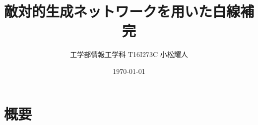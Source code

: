 \documentclass{jarticle}
\title{敵対的生成ネットワークを用いた白線補完}
\author{工学部情報工学科 T16I273C 小松耀人}
\date{\today}
\begin{document}
\maketitle
\section{概要}
\end{document}
